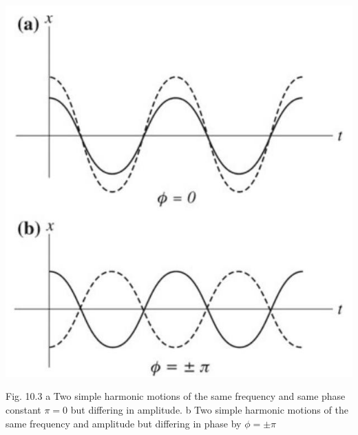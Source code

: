 \documentclass[10pt]{article}
\begin{document}
\begin{center}
\includegraphics[max width=\textwidth]{2024_09_13_db1f357d2aad0a03eb2eg-163(2)}
\end{center}

Fig. 10.3 a Two simple harmonic motions of the same frequency and same phase constant $\pi=0$ but differing in amplitude. b Two simple harmonic motions of the same frequency and amplitude but differing in phase by $\phi= \pm \pi$
\end{document}
